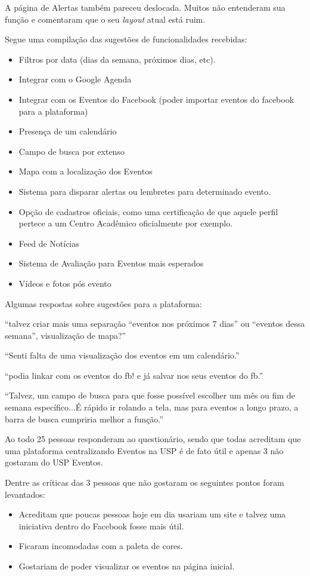 \par A página de Alertas também pareceu deslocada. Muitos não entenderam sua função e comentaram que o seu \emph{layout} atual está ruim.
\par Segue uma compilação das sugestões de funcionalidades recebidas:
\begin{itemize}
\item Filtros por data (dias da semana, próximos dias, etc).
\item Integrar com o Google Agenda
\item Integrar com os Eventos do Facebook (poder importar eventos do facebook para a plataforma)
\item Presença de um calendário
\item Campo de busca por extenso
\item Mapa com a localização dos Eventos
\item Sistema para disparar alertas ou lembretes para determinado evento.
\item Opção de cadastros oficiais, como uma certificação de que aquele perfil pertece a um Centro Acadêmico oficialmente por exemplo.
\item Feed de Notícias
\item Sistema de Avaliação para Eventos mais esperados
\item Vídeos e fotos pós evento
\end{itemize}

\par Algumas respostas sobre sugestões para a plataforma:
\par ``talvez criar mais uma separação ``eventos nos próximos 7 dias'' ou ``eventos dessa semana'', visualização de mapa?''\\
\par ``Senti falta de uma visualização dos eventos em um calendário.''\\
\par ``podia linkar com os eventos do fb! e já salvar nos seus eventos do fb.''\\
\par ``Talvez, um campo de busca para que fosse possível escolher um mês ou fim de semana específico...É rápido ir rolando a tela, mas para eventos a longo prazo, a barra de busca cumpriria melhor a função.''\\

\par Ao todo 25 pessoas responderam ao questionário, sendo que todas acreditam que uma plataforma centralizando Eventos na USP é de fato útil e  apenas 3 não gostaram do USP Eventos.
\par Dentre as críticas das 3 pessoas que não gostaram os seguintes pontos foram levantados:
\begin{itemize}
\item Acreditam que poucas pessoas hoje em dia usariam um site e talvez uma iniciativa dentro do Facebook fosse mais útil.
\item Ficaram incomodadas com a paleta de cores.
\item Gostariam de poder visualizar os eventos na página inicial.
\end{itemize}

